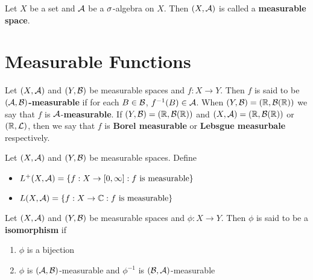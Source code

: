 \documentclass{book}
\begin{document}
	\begin{defn}  
		Let $X$ be a set and $\mathcal{A}$ be a $\sigma$-algebra on $X$. Then $(X, \mathcal{A})$ is called a \textbf{measurable space}.
	\end{defn}






















	\newpage
	\section{Measurable Functions}
	
	\begin{defn}  
		Let $(X,\mathcal{A})$ and $(Y, \mathcal{B})$ be measurable spaces and $f:X \rightarrow Y$. Then $f$ is said to be \textbf{$(\mathcal{A},\mathcal{B})$-measurable} if for each $B \in \mathcal{B}$, $f^{-1}(B) \in \mathcal{A}$. When $(Y, \mathcal{B}) = (\mathbb{R}, \mathcal{B}(\mathbb{R}))$ we say that $f$ is $\mathcal{A}$-\textbf{measurable}. If $(Y,\mathcal{B}) = (\mathbb{R}, \mathcal{B}(\mathbb{R}))$ and $(X,\mathcal{A}) = (\mathbb{R}, \mathcal{B}(\mathbb{R}))$ or $(\mathbb{R}, \mathcal{L})$, then we say that $f$ is \textbf{Borel measurable} or \textbf{Lebsgue measurbale} respectively.
	\end{defn}
	
	\begin{defn}  
		Let $(X, \mathcal{A})$ and $(Y, \mathcal{B})$ be measurable spaces. Define 
		\begin{itemize}
			\item $L^{+}(X, \mathcal{A}) = \{f:X \rightarrow [0,\infty] : f \text{ is measurable}\}$
			\item $L(X, \mathcal{A}) = \{f:X \rightarrow \mathbb{C} : f \text{ is measurable}\}$ 
		\end{itemize}
	\end{defn}
	
	\begin{defn} 
		Let $(X, \mathcal{A})$ and $(Y, \mathcal{B})$ be measurable spaces and $\phi: X \rightarrow Y$. Then $\phi$ is said to be a \textbf{isomorphism} if 
		\begin{enumerate}
			\item $\phi$ is a bijection
			\item $\phi$ is $(\mathcal{A}, \mathcal{B})$-measurable and $\phi^{-1}$ is $(\mathcal{B}, \mathcal{A})$-measurable
		\end{enumerate}
	\end{defn}
\end{document}
